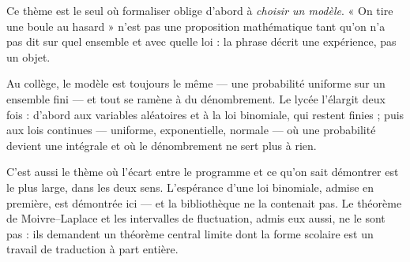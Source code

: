 Ce thème est le seul où formaliser oblige d'abord à \emph{choisir un modèle}. « On tire une
boule au hasard » n'est pas une proposition mathématique tant qu'on n'a pas dit sur quel
ensemble et avec quelle loi : la phrase décrit une expérience, pas un objet.

Au collège, le modèle est toujours le même — une probabilité uniforme sur un ensemble fini —
et tout se ramène à du dénombrement. Le lycée l'élargit deux fois : d'abord aux variables
aléatoires et à la loi binomiale, qui restent finies ; puis aux lois continues — uniforme,
exponentielle, normale — où une probabilité devient une intégrale et où le dénombrement ne
sert plus à rien.

C'est aussi le thème où l'écart entre le programme et ce qu'on sait démontrer est le plus
large, dans les deux sens. L'espérance d'une loi binomiale, admise en première, est démontrée
ici — et la bibliothèque ne la contenait pas. Le théorème de Moivre–Laplace et les intervalles
de fluctuation, admis eux aussi, ne le sont pas : ils demandent un théorème central limite
dont la forme scolaire est un travail de traduction à part entière.

